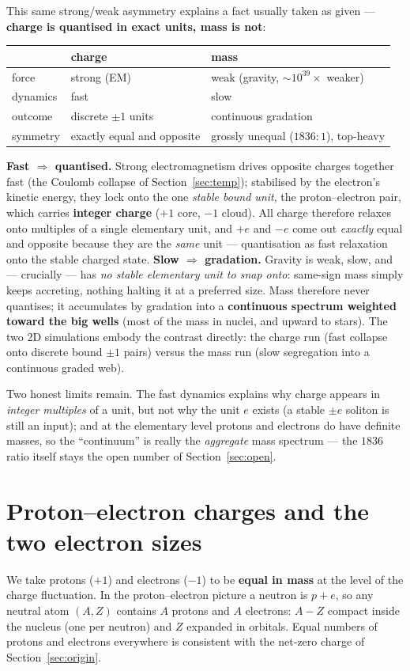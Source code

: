 \documentclass[11pt]{article}
\begin{document}
This same strong/weak asymmetry explains a fact usually taken as given --- \textbf{charge is quantised in
exact units, mass is not}:
\begin{center}
\begin{tabular}{lll}
\toprule
 & charge & mass \\
\midrule
force & strong (EM) & weak (gravity, ${\sim}10^{39}\times$ weaker) \\
dynamics & fast & slow \\
outcome & discrete $\pm1$ units & continuous gradation \\
symmetry & exactly equal and opposite & grossly unequal ($1836{:}1$), top-heavy \\
\bottomrule
\end{tabular}
\end{center}
\textbf{Fast $\Rightarrow$ quantised.} Strong electromagnetism drives opposite charges together fast (the
Coulomb collapse of Section~\ref{sec:temp}); stabilised by the electron's kinetic energy, they lock onto
the one \emph{stable bound unit}, the proton--electron pair, which carries \textbf{integer charge} ($+1$
core, $-1$ cloud). All charge therefore relaxes onto multiples of a single elementary unit, and $+e$ and
$-e$ come out \emph{exactly} equal and opposite because they are the \emph{same} unit --- quantisation as
fast relaxation onto the stable charged state.
\textbf{Slow $\Rightarrow$ gradation.} Gravity is weak, slow, and --- crucially --- has \emph{no stable
elementary unit to snap onto}: same-sign mass simply keeps accreting, nothing halting it at a preferred
size. Mass therefore never quantises; it accumulates by gradation into a \textbf{continuous spectrum
weighted toward the big wells} (most of the mass in nuclei, and upward to stars). The two 2D simulations
embody the contrast directly: the charge run (fast collapse onto discrete bound $\pm1$ pairs) versus the
mass run (slow segregation into a continuous graded web).

Two honest limits remain. The fast dynamics explains why charge appears in \emph{integer multiples} of a
unit, but not why the unit $e$ exists (a stable $\pm e$ soliton is still an input); and at the elementary
level protons and electrons do have definite masses, so the ``continuum'' is really the \emph{aggregate}
mass spectrum --- the $1836$ ratio itself stays the open number of Section~\ref{sec:open}.

\section{Proton--electron charges and the two electron sizes}\label{sec:scales}
We take protons ($+1$) and electrons ($-1$) to be \textbf{equal in mass} at the level of the charge
fluctuation. In the proton--electron picture a neutron is $p+e$, so any neutral atom $(A,Z)$ contains
$A$ protons and $A$ electrons: $A-Z$ compact inside the nucleus (one per neutron) and $Z$ expanded in
orbitals. Equal numbers of protons and electrons everywhere is consistent with the net-zero charge of
Section~\ref{sec:origin}.
\end{document}

